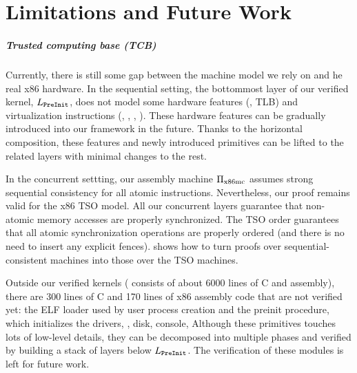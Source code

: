 \chapter{Limitations and Future Work}
\label{chap-limits}



\paragraph{Trusted computing base (TCB)}
Currently, there is still some gap between the machine model we rely on and he real x86 hardware.
In the sequential setting,
the bottommost layer of our
verified kernel, {$L_{\texttt{PreInit}}$}, does not model
some  hardware features (\eg, TLB) and virtualization
instructions (\eg, , , ). 
These hardware features can be gradually introduced into our framework in the future. Thanks to the horizontal composition,
these features and newly introduced primitives can be lifted to the related layers with minimal changes to the rest.

In the concurrent settting,
our assembly machine $\Pi_{\text{x86mc}}$ assumes strong sequential consistency for all
atomic instructions. Nevertheless, our proof remains valid for the x86
TSO model. All our concurrent layers guarantee that non-atomic memory
accesses are properly synchronized.  The TSO order guarantees that all
atomic synchronization operations are properly ordered (and there is
no need to insert any explicit fences).  \citet{vontessin13} shows how
to turn proofs over sequential-consistent machines into those over
the TSO machines.

Outside our verified kernels
(\cCTOS{} consists of about 6000 lines of C and assembly), there
are 300 lines of C and 170 lines of x86 assembly code that are not
verified yet: the ELF loader used by user
process creation
and the preinit procedure, which initializes the drivers, \eg,
disk, console, {\etc}
Although these primitives touches lots of low-level details,
they can be decomposed into multiple phases and verified by building 
a stack of layers below $L_{\texttt{PreInit}}$.
The verification of these modules 
is left for future work. 

